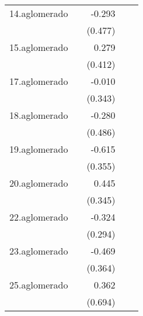 {\begin{longtable}{l*{4}{D{.}{.}{-1}}}
\addlinespace
14.aglomerado&                     &      -0.293         &                     &                     \\
            &                     &     (0.477)         &                     &                     \\
\addlinespace
15.aglomerado&                     &       0.279         &                     &                     \\
            &                     &     (0.412)         &                     &                     \\
\addlinespace
17.aglomerado&                     &      -0.010         &                     &                     \\
            &                     &     (0.343)         &                     &                     \\
\addlinespace
18.aglomerado&                     &      -0.280         &                     &                     \\
            &                     &     (0.486)         &                     &                     \\
\addlinespace
19.aglomerado&                     &      -0.615         &                     &                     \\
            &                     &     (0.355)         &                     &                     \\
\addlinespace
20.aglomerado&                     &       0.445         &                     &                     \\
            &                     &     (0.345)         &                     &                     \\
\addlinespace
22.aglomerado&                     &      -0.324         &                     &                     \\
            &                     &     (0.294)         &                     &                     \\
\addlinespace
23.aglomerado&                     &      -0.469         &                     &                     \\
            &                     &     (0.364)         &                     &                     \\
\addlinespace
25.aglomerado&                     &       0.362         &                     &                     \\
            &                     &     (0.694)         &                     &                     \\

\end{longtable}}
